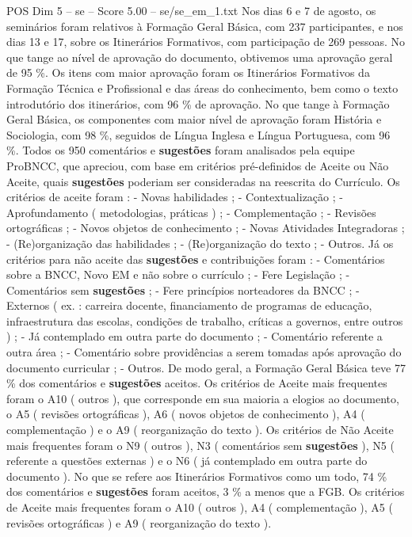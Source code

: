 \begin{textsample}{POS Dim 5 – se – Score 5.00 – se/se\_em\_1.txt}
Nos dias 6 e 7 de agosto, os seminários foram relativos à Formação Geral Básica, com 237 participantes, e nos dias 13 e 17, sobre os Itinerários Formativos, com participação de 269 pessoas.
No que tange ao nível de aprovação do documento, obtivemos uma aprovação geral de 95 \%.
Os itens com maior aprovação foram os Itinerários Formativos da Formação Técnica e Profissional e das áreas do conhecimento, bem como o texto introdutório dos itinerários, com 96 \% de aprovação.
No que tange à Formação Geral Básica, os componentes com maior nível de aprovação foram História e Sociologia, com 98 \%, seguidos de Língua Inglesa e Língua Portuguesa, com 96 \%.
Todos os 950 comentários e \textbf{sugestões} foram analisados pela equipe ProBNCC, que apreciou, com base em critérios pré-definidos de Aceite ou Não Aceite, quais \textbf{sugestões} poderiam ser consideradas na reescrita do Currículo.
Os critérios de aceite foram : - Novas habilidades ; - Contextualização ; - Aprofundamento ( metodologias, práticas ) ; - Complementação ; - Revisões ortográficas ; - Novos objetos de conhecimento ; - Novas Atividades Integradoras ; - (Re)organização das habilidades ; - (Re)organização do texto ; - Outros.
Já os critérios para não aceite das \textbf{sugestões} e contribuições foram : - Comentários sobre a BNCC, Novo EM e não sobre o currículo ; - Fere Legislação ; - Comentários sem \textbf{sugestões} ; - Fere princípios norteadores da BNCC ; - Externos ( ex. : carreira docente, financiamento de programas de educação, infraestrutura das escolas, condições de trabalho, críticas a governos, entre outros ) ; - Já contemplado em outra parte do documento ; - Comentário referente a outra área ; - Comentário sobre providências a serem tomadas após aprovação do documento curricular ; - Outros.
De modo geral, a Formação Geral Básica teve 77 \% dos comentários e \textbf{sugestões} aceitos.
Os critérios de Aceite mais frequentes foram o A10 ( outros ), que corresponde em sua maioria a elogios ao documento, o A5 ( revisões ortográficas ), A6 ( novos objetos de conhecimento ), A4 ( complementação ) e o A9 ( reorganização do texto ).
Os critérios de Não Aceite mais frequentes foram o N9 ( outros ), N3 ( comentários sem \textbf{sugestões} ), N5 ( referente a questões externas ) e o N6 ( já contemplado em outra parte do documento ).
No que se refere aos Itinerários Formativos como um todo, 74 \% dos comentários e \textbf{sugestões} foram aceitos, 3 \% a menos que a FGB.
Os critérios de Aceite mais frequentes foram o A10 ( outros ), A4 ( complementação ), A5 ( revisões ortográficas ) e A9 ( reorganização do texto ).

\end{textsample}

